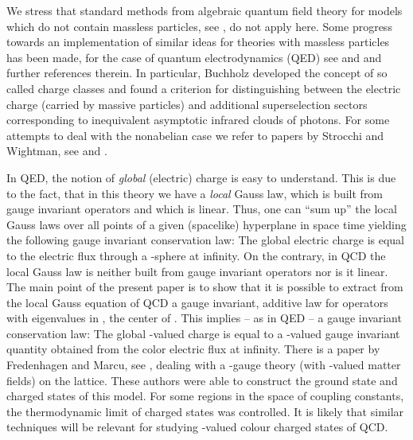 \documentclass[a4paper,12pt]{article}
\begin{document}
We stress that standard methods from algebraic quantum field
theory for models which do not contain massless particles, see
\cite{DHR}, do not apply here. Some progress towards an
implementation of similar ideas for theories with massless
particles has been made, for the case of quantum electrodynamics
(QED) see \cite{JF} and \cite{Bu} and further references therein.
In particular, Buchholz developed the concept of so called charge
classes and found a criterion for distinguishing between the
electric charge (carried by massive particles) and additional
superselection sectors corresponding to inequivalent asymptotic
infrared clouds of photons. For some attempts to deal with the
nonabelian case we refer to papers by Strocchi and Wightman, see
\cite{SW1} and \cite{S}.


In QED, the notion of {\em global} (electric) charge is easy to
understand. This is due to the fact, that in this theory we have a
{\em local} Gauss law, which is built from gauge invariant
operators and which is linear. Thus, one can ``sum up'' the local
Gauss laws over all points of a given (spacelike) hyperplane in
space time yielding the following gauge invariant conservation
law: The global electric charge is equal to the electric flux
through a \coordHE{}-sphere at infinity. On the contrary, in QCD the
local Gauss law is neither built from gauge invariant operators
nor is it linear. The main point of the present paper is to show
that it is possible to extract from the local Gauss equation of
QCD a gauge invariant, additive law for operators with eigenvalues
in \coordHE{}, the center of \coordHE{}. This implies -- as in
QED -- a gauge invariant conservation law: The global \coordHE{}-valued charge is equal to a \coordHE{}-valued gauge
invariant quantity obtained from the color electric flux at
infinity. There is a paper by Fredenhagen and Marcu, see
\cite{FM}, dealing with a \coordHE{}-gauge theory (with
\coordHE{}-valued matter fields) on the lattice. These
authors were able to construct the ground state and charged states
of this model. For some regions in the space of coupling
constants, the thermodynamic limit of charged states was
controlled. It is likely that similar techniques will be relevant
for studying \coordHE{}-valued colour charged states of QCD.
\end{document}
